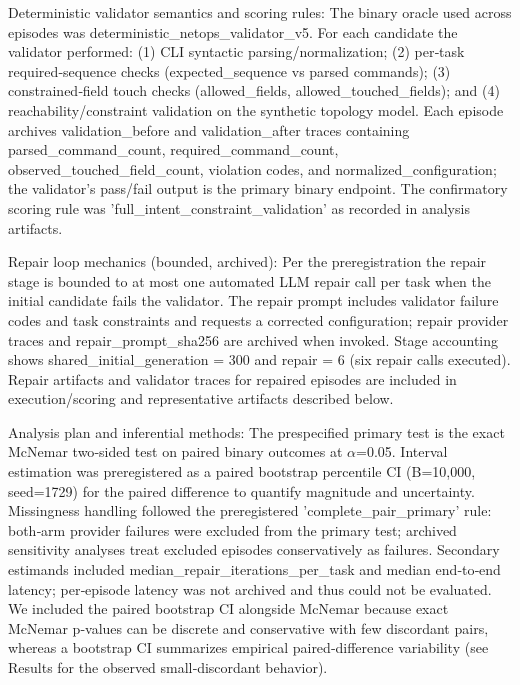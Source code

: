 \documentclass[conference]{IEEEtran}
\begin{document}
Deterministic validator semantics and scoring rules: The binary oracle used across episodes was deterministic\_netops\_validator\_v5. For each candidate the validator performed: (1) CLI syntactic parsing/normalization; (2) per‑task required‑sequence checks (expected\_sequence vs parsed commands); (3) constrained‑field touch checks (allowed\_fields, allowed\_touched\_fields); and (4) reachability/constraint validation on the synthetic topology model. Each episode archives validation\_before and validation\_after traces containing parsed\_command\_count, required\_command\_count, observed\_touched\_field\_count, violation codes, and normalized\_configuration; the validator's pass/fail output is the primary binary endpoint. The confirmatory scoring rule was 'full\_intent\_constraint\_validation' as recorded in analysis artifacts.

Repair loop mechanics (bounded, archived): Per the preregistration the repair stage is bounded to at most one automated LLM repair call per task when the initial candidate fails the validator. The repair prompt includes validator failure codes and task constraints and requests a corrected configuration; repair provider traces and repair\_prompt\_sha256 are archived when invoked. Stage accounting shows shared\_initial\_generation = 300 and repair = 6 (six repair calls executed). Repair artifacts and validator traces for repaired episodes are included in execution/scoring and representative artifacts described below.

Analysis plan and inferential methods: The prespecified primary test is the exact McNemar two‑sided test on paired binary outcomes at \ensuremath{\alpha}=0.05. Interval estimation was preregistered as a paired bootstrap percentile CI (B=10,000, seed=1729) for the paired difference to quantify magnitude and uncertainty. Missingness handling followed the preregistered 'complete\_pair\_primary' rule: both‑arm provider failures were excluded from the primary test; archived sensitivity analyses treat excluded episodes conservatively as failures. Secondary estimands included median\_repair\_iterations\_per\_task and median end‑to‑end latency; per‑episode latency was not archived and thus could not be evaluated. We included the paired bootstrap CI alongside McNemar because exact McNemar p‑values can be discrete and conservative with few discordant pairs, whereas a bootstrap CI summarizes empirical paired‑difference variability (see Results for the observed small‑discordant behavior).
\end{document}
